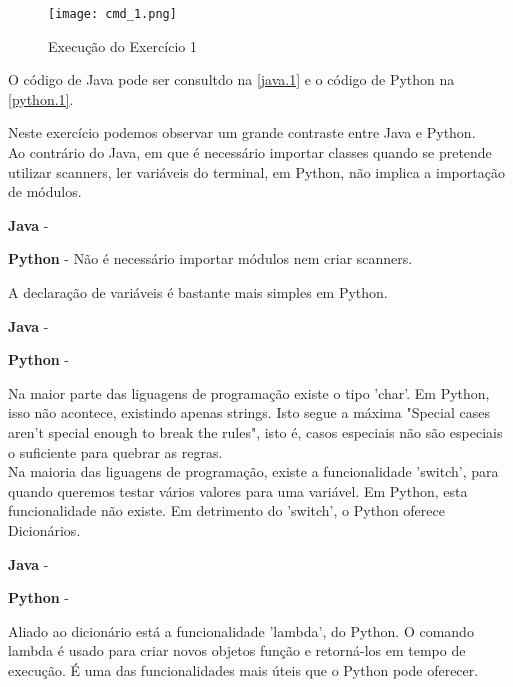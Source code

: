 \documentclass[a4paper]{report}
\begin{document}
\begin{figure}[ht]
 \texttt{[image: cmd\_1.png]}
 \caption{Execução do Exercício 1}
 \label{cmd1}
\end{figure}


O código de Java pode ser consultdo na \autoref{java.1} e o código de Python na \autoref{python.1}.

Neste exercício podemos observar um grande contraste entre Java e Python.\\
Ao contrário do Java, em que é necessário importar classes quando se pretende utilizar scanners, ler variáveis do terminal, em Python,  não implica a importação de módulos.
    \begin{description}
        \item \textbf{Java} - 
        \item \textbf{Python} - Não é necessário importar módulos nem criar scanners.
    \end{description}
\clearpage
A declaração de variáveis é bastante mais simples em Python.
    \begin{description}
        \item \textbf{Java} - 
        \item \textbf{Python} - 
    \end{description}
Na maior parte das liguagens de programação existe o tipo 'char'. Em Python, isso não acontece, existindo apenas strings.  Isto segue a máxima "Special cases aren’t special enough to break the rules", isto é, casos especiais não são especiais o suficiente para quebrar as regras.
\\[5pt]
Na maioria das liguagens de programação, existe a funcionalidade 'switch', para quando queremos testar vários valores para uma variável. Em Python, esta funcionalidade não existe. Em detrimento do 'switch', o Python oferece Dicionários.

    \begin{description}
        \item \textbf{Java} - 
        \item \textbf{Python} - 
    \end{description}

Aliado ao dicionário está a funcionalidade 'lambda', do Python. O comando lambda é usado para criar novos objetos função e retorná-los em tempo de execução. É uma das funcionalidades mais úteis que o Python pode oferecer.
\end{document}

